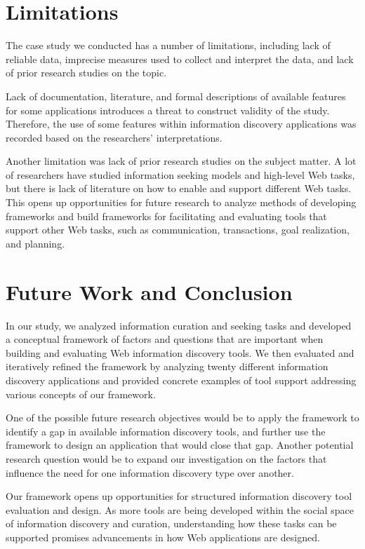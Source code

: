 \documentclass{casconpaper}
\begin{document}
{\section{Limitations}
The case study we conducted has a number of limitations, including lack of reliable data, imprecise measures used to collect and interpret the data, and lack of prior research studies on the topic. 

Lack of documentation, literature, and formal descriptions of available features for some applications introduces a threat to construct validity of the study. Therefore, the use of some features within information discovery applications was recorded based on the researchers' interpretations. 

Another limitation was lack of prior research studies on the subject matter. A lot of researchers have studied information seeking models and high-level Web tasks, but there is lack of literature on how to enable and support different Web tasks. This opens up opportunities for future research to analyze methods of developing frameworks and build frameworks for facilitating and evaluating tools that support other Web tasks, such as communication, transactions, goal realization, and planning.

} %

{\section{ Future Work and Conclusion }
In our study, we analyzed information curation and seeking tasks and developed a conceptual framework of factors and questions that are important when building and evaluating Web information discovery tools. We then evaluated and iteratively refined the framework by analyzing twenty different information discovery applications and provided concrete examples of tool support addressing various concepts of our framework.

One of the possible future research objectives would be to apply the framework to identify a gap in available information discovery tools, and further use the framework to design an application that would close that gap. Another potential research question would be to expand our investigation on the factors that influence the need for one information discovery type over another. 

Our framework opens up opportunities for structured information discovery tool evaluation and design. As more tools are being developed within the social space of information discovery and curation, understanding how these tasks can be supported promises advancements in how Web applications are designed.

} %
\end{document}
